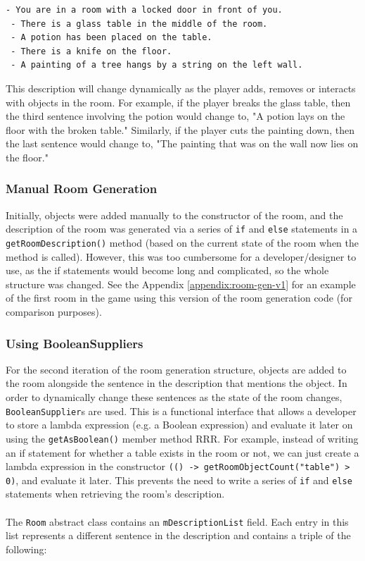\documentclass[11pt]{article}
\begin{document}
\begin{lstlisting}[label=lst:room01-description]
 - You are in a room with a locked door in front of you.
 - There is a glass table in the middle of the room.
 - A potion has been placed on the table.
 - There is a knife on the floor.
 - A painting of a tree hangs by a string on the left wall.
\end{lstlisting}

This description will change dynamically as the player adds, removes or interacts with objects in the room. For example, if the player breaks the glass table, then the third sentence involving the potion would change to, "A potion lays on the floor with the broken table." Similarly, if the player cuts the painting down, then the last sentence would change to, "The painting that was on the wall now lies on the floor."

\subsubsection{Manual Room Generation}

Initially, objects were added manually to the constructor of the room, and the description of the room was generated via a series of \texttt{if} and \texttt{else} statements in a \texttt{getRoomDescription()} method (based on the current state of the room when the method is called). However, this was too cumbersome for a developer/designer to use, as the if statements would become long and complicated, so the whole structure was changed. See the Appendix \ref{appendix:room-gen-v1} for an example of the first room in the game using this version of the room generation code (for comparison purposes).

\subsubsection{Using BooleanSuppliers}

For the second iteration of the room generation structure, objects are added to the room alongside the sentence in the description that mentions the object. In order to dynamically change these sentences as the state of the room changes, \texttt{BooleanSupplier}s are used. This is a functional interface that allows a developer to store a lambda expression (e.g. a Boolean expression) and evaluate it later on using the \texttt{getAsBoolean()} member method RRR. For example, instead of writing an if statement for whether a table exists in the room or not, we can just create a lambda expression in the constructor \texttt{(() -> getRoomObjectCount("table") > 0)}, and evaluate it later. This prevents the need to write a series of \texttt{if} and \texttt{else} statements when retrieving the room's description.
\\
\\
The \texttt{Room} abstract class contains an \texttt{mDescriptionList} field. Each entry in this list represents a different sentence in the description and contains a triple of the following:
\end{document}
